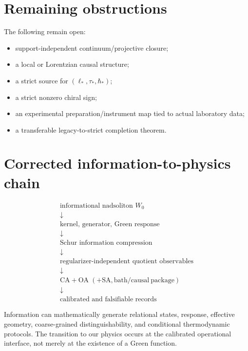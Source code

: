 \documentclass[11pt,a4paper,openany]{report}
\begin{document}
\section{Remaining obstructions}

The following remain open:

\begin{itemize}
\item 
support-independent continuum/\allowbreak{}projective closure;

\item 
a local or Lorentzian causal structure;

\item 
a strict source for \((\ell_*,\tau_*,\hbar_*)\);

\item 
a strict nonzero chiral sign;

\item 
an experimental preparation/\allowbreak{}instrument map tied to actual laboratory data;

\item 
a transferable legacy-to-strict completion theorem.

\end{itemize}

\section{Corrected information-to-physics chain}

\[
\boxed{
\begin{array}{c}
\text{informational nadsoliton }W_0\\
\downarrow\\
\text{kernel, generator, Green response}\\
\downarrow\\
\text{Schur information compression}\\
\downarrow\\
\text{regularizer-independent quotient observables}\\
\downarrow\\
\mathrm{CA}+\mathrm{OA}\;(+\mathrm{SA},\mathrm{bath/causal\ package})\\
\downarrow\\
\text{calibrated and falsifiable records}
\end{array}
}
\]

Information can mathematically generate relational states, response, effective geometry, coarse-grained distinguishability, and conditional thermodynamic protocols. The transition to our physics occurs at the calibrated operational interface, not merely at the existence of a Green function.
\end{document}
